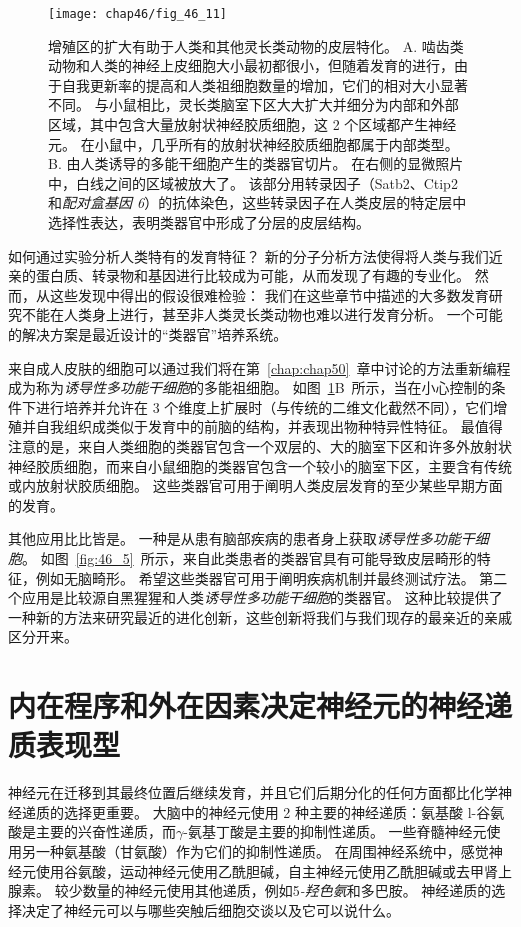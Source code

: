 \begin{figure}[htbp]
	\centering
	\texttt{[image: chap46/fig\_46\_11]}
	\caption{增殖区的扩大有助于人类和其他灵长类动物的皮层特化。
		A. 啮齿类动物和人类的神经上皮细胞大小最初都很小，但随着发育的进行，由于自我更新率的提高和人类祖细胞数量的增加，它们的相对大小显著不同。
		与小鼠相比，灵长类脑室下区大大扩大并细分为内部和外部区域，其中包含大量放射状神经胶质细胞，这 2 个区域都产生神经元。
		在小鼠中，几乎所有的放射状神经胶质细胞都属于内部类型\cite{giandomenico2017probing}。
		B. 由人类诱导的多能干细胞产生的类器官切片。
		在右侧的显微照片中，白线之间的区域被放大了。
		该部分用转录因子（Satb2、Ctip2 和\textit{配对盒基因 6}）的抗体染色，这些转录因子在人类皮层的特定层中选择性表达，表明类器官中形成了分层的皮层结构。}
	\label{fig:46_11}
\end{figure}


如何通过实验分析人类特有的发育特征？
新的分子分析方法使得将人类与我们近亲的蛋白质、转录物和基因进行比较成为可能，从而发现了有趣的专业化。
然而，从这些发现中得出的假设很难检验：
我们在这些章节中描述的大多数发育研究不能在人类身上进行，甚至非人类灵长类动物也难以进行发育分析。
一个可能的解决方案是最近设计的“类器官”培养系统。


来自成人皮肤的细胞可以通过我们将在第~\ref{chap:chap50}~章中讨论的方法重新编程成为称为\textit{诱导性多功能干细胞}的多能祖细胞。
如图~\ref{fig:46_11}B~所示，当在小心控制的条件下进行培养并允许在 3 个维度上扩展时（与传统的二维文化截然不同），它们增殖并自我组织成类似于发育中的前脑的结构，并表现出物种特异性特征。
最值得注意的是，来自人类细胞的类器官包含一个双层的、大的脑室下区和许多外放射状神经胶质细胞，而来自小鼠细胞的类器官包含一个较小的脑室下区，主要含有传统或内放射状胶质细胞。
这些类器官可用于阐明人类皮层发育的至少某些早期方面的发育。


其他应用比比皆是。
一种是从患有脑部疾病的患者身上获取\textit{诱导性多功能干细胞}。
如图~\ref{fig:46_5}~所示，来自此类患者的类器官具有可能导致皮层畸形的特征，例如无脑畸形。
希望这些类器官可用于阐明疾病机制并最终测试疗法。
第二个应用是比较源自黑猩猩和人类\textit{诱导性多功能干细胞}的类器官。
这种比较提供了一种新的方法来研究最近的进化创新，这些创新将我们与我们现存的最亲近的亲戚区分开来。


\section{内在程序和外在因素决定神经元的神经递质表现型}

神经元在迁移到其最终位置后继续发育，并且它们后期分化的任何方面都比化学神经递质的选择更重要。
大脑中的神经元使用 2 种主要的神经递质：氨基酸 l-谷氨酸是主要的兴奋性递质，而$\gamma$-氨基丁酸是主要的抑制性递质。
一些脊髓神经元使用另一种氨基酸（甘氨酸）作为它们的抑制性递质。
在周围神经系统中，感觉神经元使用谷氨酸，运动神经元使用乙酰胆碱，自主神经元使用乙酰胆碱或去甲肾上腺素。
较少数量的神经元使用其他递质，例如5\textit{-羟色氨}和多巴胺。
神经递质的选择决定了神经元可以与哪些突触后细胞交谈以及它可以说什么。



